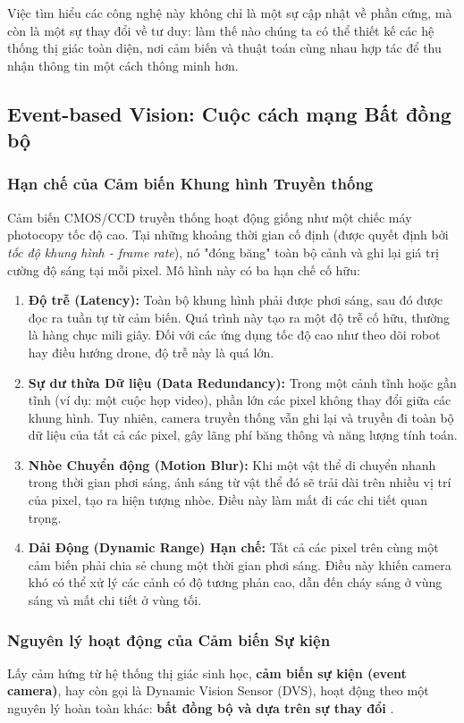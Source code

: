 Việc tìm hiểu các công nghệ này không chỉ là một sự cập nhật về phần cứng, mà còn là một sự thay đổi về tư duy: làm thế nào chúng ta có thể thiết kế các hệ thống thị giác toàn diện, nơi cảm biến và thuật toán cùng nhau hợp tác để thu nhận thông tin một cách thông minh hơn.

\subsection{Event-based Vision: Cuộc cách mạng Bất đồng bộ}
\label{subsec:event_based_vision}

\subsubsection{Hạn chế của Cảm biến Khung hình Truyền thống}
\label{subsubsec:frame_based_limitations}
Cảm biến CMOS/CCD truyền thống hoạt động giống như một chiếc máy photocopy tốc độ cao. Tại những khoảng thời gian cố định (được quyết định bởi \textit{tốc độ khung hình - frame rate}), nó "đóng băng" toàn bộ cảnh và ghi lại giá trị cường độ sáng tại mỗi pixel. Mô hình này có ba hạn chế cố hữu:
\begin{enumerate}
    \item \textbf{Độ trễ (Latency):} Toàn bộ khung hình phải được phơi sáng, sau đó được đọc ra tuần tự từ cảm biến. Quá trình này tạo ra một độ trễ cố hữu, thường là hàng chục mili giây. Đối với các ứng dụng tốc độ cao như theo dõi robot hay điều hướng drone, độ trễ này là quá lớn.
    \item \textbf{Sự dư thừa Dữ liệu (Data Redundancy):} Trong một cảnh tĩnh hoặc gần tĩnh (ví dụ: một cuộc họp video), phần lớn các pixel không thay đổi giữa các khung hình. Tuy nhiên, camera truyền thống vẫn ghi lại và truyền đi toàn bộ dữ liệu của tất cả các pixel, gây lãng phí băng thông và năng lượng tính toán.
    \item \textbf{Nhòe Chuyển động (Motion Blur):} Khi một vật thể di chuyển nhanh trong thời gian phơi sáng, ánh sáng từ vật thể đó sẽ trải dài trên nhiều vị trí của pixel, tạo ra hiện tượng nhòe. Điều này làm mất đi các chi tiết quan trọng.
    \item \textbf{Dải Động (Dynamic Range) Hạn chế:} Tất cả các pixel trên cùng một cảm biến phải chia sẻ chung một thời gian phơi sáng. Điều này khiến camera khó có thể xử lý các cảnh có độ tương phản cao, dẫn đến cháy sáng ở vùng sáng và mất chi tiết ở vùng tối.
\end{enumerate}

\subsubsection{Nguyên lý hoạt động của Cảm biến Sự kiện}
\label{subsubsec:event_camera_principles}
Lấy cảm hứng từ hệ thống thị giác sinh học, \textbf{cảm biến sự kiện (event camera)}, hay còn gọi là Dynamic Vision Sensor (DVS), hoạt động theo một nguyên lý hoàn toàn khác: \textbf{bất đồng bộ và dựa trên sự thay đổi} \cite{Gallego2020}.

